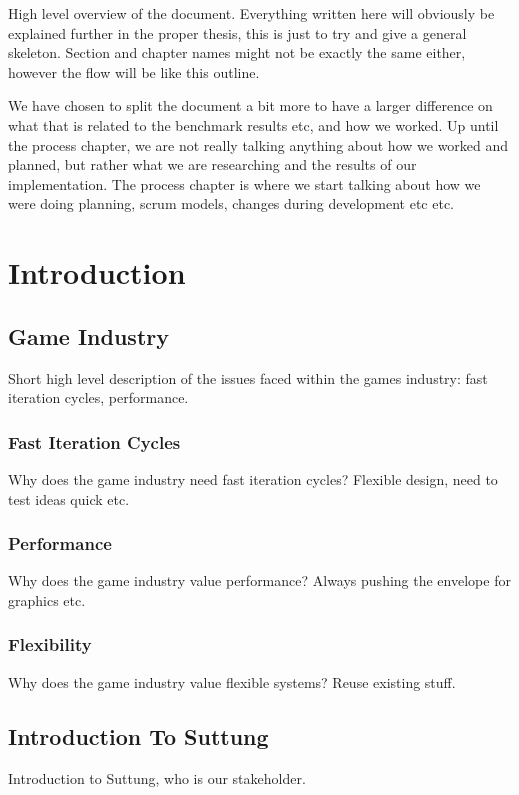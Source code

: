 High level overview of the document.
Everything written here will obviously be explained further in the proper thesis, this is just to try and give a general skeleton.
Section and chapter names might not be exactly the same either,
however the flow will be like this outline.

We have chosen to split the document a bit more to have a larger difference on what
that is related to the benchmark results etc, and how we worked.
Up until the process chapter, we are not really talking anything about how we worked and planned,
but rather what we are researching and the results of our implementation.
The process chapter is where we start talking about how we were doing planning,
scrum models, changes during development etc etc.

\chapter{Introduction}
\label{chap:introduction}

\section{Game Industry}
Short high level description of the issues faced within the games industry: fast iteration cycles, performance.

\subsection{Fast Iteration Cycles}
Why does the game industry need fast iteration cycles?
Flexible design, need to test ideas quick etc.

\subsection{Performance}
Why does the game industry value performance?
Always pushing the envelope for graphics etc.

\subsection{Flexibility}
Why does the game industry value flexible systems?
Reuse existing stuff.

\section{Introduction To Suttung}
Introduction to Suttung, who is our stakeholder.

